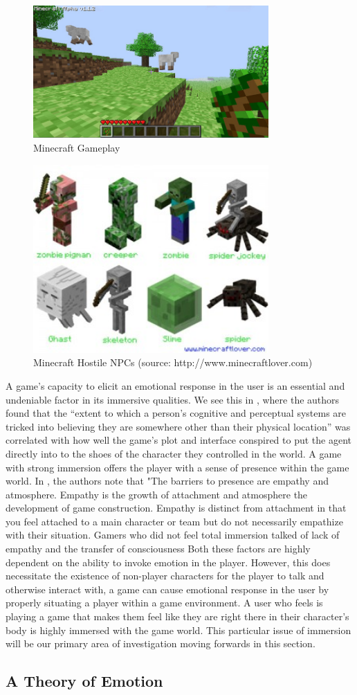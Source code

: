 \begin{figure}[ht!]
\centering
\includegraphics[width=90mm]{minecraft-32.jpg}
\caption{Minecraft Gameplay \label{overflow}}
\label{fig:Minecraft}
\end{figure}
\cite{fig:MCmonster} 
\begin{figure}[ht!]
\centering
\includegraphics[width=90mm]{minecraft-spider-300x240.jpg}
\caption{Minecraft Hostile NPCs (source: http://www.minecraftlover.com) \label{overflow}}
\label{fig:MCmonster}
\end{figure}
A game's capacity to elicit an emotional response in the user is an essential and undeniable factor in its immersive qualities. We see this in \cite{Brown04agrounded}, where the authors found that the “extent to which a person’s cognitive and
perceptual systems are tricked into believing they are
somewhere other than their physical location” \cite{Brown04agrounded}  was correlated with how well the game's plot and interface conspired to put the agent directly into to the shoes of the character they controlled in the world. A game with strong immersion offers the player with a sense of presence within the game world. In \cite{Brown04agrounded}, the authors note that "The barriers to presence are empathy and atmosphere.
Empathy is the growth of attachment and atmosphere the
development of game construction. Empathy is distinct
from attachment in that you feel attached to a main
character or team but do not necessarily empathize with
their situation. Gamers who did not feel total immersion
talked of lack of empathy and the transfer of consciousness Both these factors are highly dependent on the ability to invoke emotion in the player. However, this does necessitate the existence of non-player characters for the player to talk and otherwise interact with, a game can cause emotional response in the user by properly situating a player within a game environment. A user who feels is playing a game that makes  them feel like they are right there in their character's body is highly immersed with the game world. This particular issue of immersion will be our primary area of investigation moving forwards in this section.
\subsection{A Theory of Emotion }
